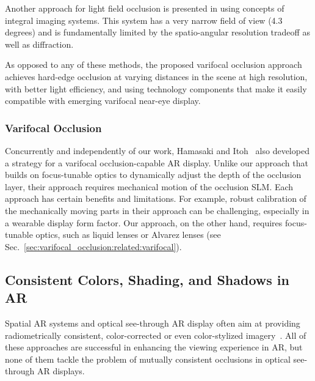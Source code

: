 Another approach for light field occlusion is presented in \cite{Yamaguchi2016} using concepts of integral imaging systems. This system has a very narrow field of view (4.3 degrees) and is fundamentally limited by the spatio-angular resolution tradeoff as well as diffraction.

As opposed to any of these methods, the proposed varifocal occlusion approach achieves hard-edge occlusion at varying distances in the scene at high resolution, with better light efficiency, and using technology components that make it easily compatible with emerging varifocal near-eye display. 

\subsubsection{Varifocal Occlusion}
Concurrently and independently of our work, Hamasaki and Itoh~\cite{Hamasaki2019} also developed a strategy for a varifocal occlusion-capable AR display. Unlike our approach that builds on focus-tunable optics to dynamically adjust the depth of the occlusion layer, their approach requires mechanical motion of the occlusion SLM. Each approach has certain benefits and limitations. For example, robust calibration of the mechanically moving parts in their approach can be challenging, especially in a wearable display form factor. Our approach, on the other hand, requires focus-tunable optics, such as liquid lenses or Alvarez lenses (see Sec.~\ref{sec:varifocal_occlusion:related:varifocal}).

\subsection{Consistent Colors, Shading, and Shadows in AR}
Spatial AR systems and optical see-through AR display often aim at providing radiometrically consistent, color-corrected or even color-stylized imagery~\cite{Bimber:2008,Wetzstein2010,Langlotz:2016,Langlotz2018,Itoh2019}. All of these approaches are successful in enhancing the viewing experience in AR, but none of them tackle the problem of mutually consistent occlusions in optical see-through AR displays.

